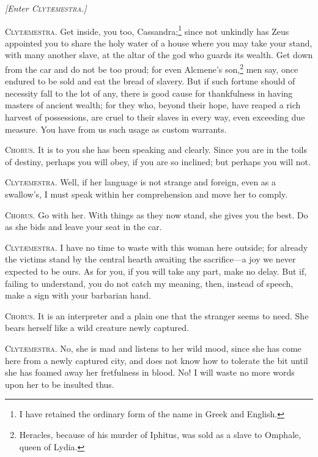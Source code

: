 \documentclass[12pt]{article}
\begin{document}
\begin{center}
\textit{[Enter \textsc{Clyt{\ae}mestra.}]}
\end{center}

\textsc{Clyt{\ae}mestra.} Get inside, you too, Cassandra;\footnote{I have retained the ordinary form of the name in Greek and English.} since not unkindly has Zeus appointed you to share the holy water of a house where you may take your stand, with many another slave, at the altar of the god who guards its wealth. Get down from the car and do not be too proud; for even Alcmene's son,\footnote{Heracles, because of his murder of Iphitus, was sold as a slave to Omphale, queen of Lydia.} men say, once endured to be sold and eat the bread of slavery. But if such fortune should of necessity fall to the lot of any, there is good cause for thankfulness in having masters of ancient wealth; for they who, beyond their hope, have reaped a rich harvest of possessions, are cruel to their slaves in every way, even exceeding due measure. You have from us such usage as custom warrants.

\textsc{Chorus.} It is to you she has been speaking and clearly. Since you are in the toils of destiny, perhaps you will obey, if you are so inclined; but perhaps you will not.

\textsc{Clyt{\ae}mestra.} Well, if her language is not strange and foreign, even as a swallow's, I must speak within her comprehension and move her to comply.

\textsc{Chorus.} Go with her. With things as they now stand, she gives you the best. Do as she bids and leave your seat in the car.

\textsc{Clyt{\ae}mestra.} I have no time to waste with this woman here outside; for already the victims stand by the central hearth awaiting the sacrifice---a joy we never expected to be ours. As for you, if you will take any part, make no delay. But if, failing to understand, you do not catch my meaning, then, instead of speech, make a sign with your barbarian hand.

\textsc{Chorus.} It is an interpreter and a plain one that the stranger seems to need. She bears herself like a wild creature newly captured.

\textsc{Clyt{\ae}mestra.} No, she is mad and listens to her wild mood, since she has come here from a newly captured city, and does not know how to tolerate the bit until she has foamed away her fretfulness in blood. No! I will waste no more words upon her to be insulted thus.
\end{document}

